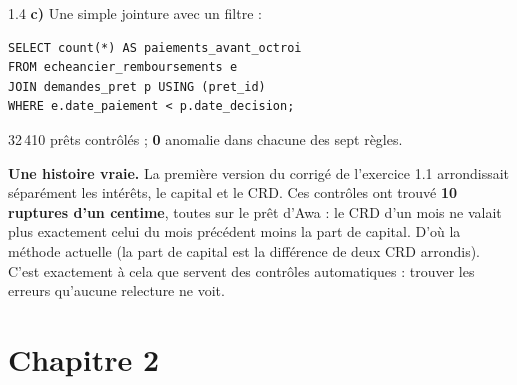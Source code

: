 \begin{correction}{1.4}
\textbf{c)} Une simple jointure avec un filtre :
\begin{lstlisting}[style=long]
SELECT count(*) AS paiements_avant_octroi
FROM echeancier_remboursements e
JOIN demandes_pret p USING (pret_id)
WHERE e.date_paiement < p.date_decision;
\end{lstlisting}

\begin{resultat}
32\,410 prêts contrôlés ; \textbf{0} anomalie dans chacune des sept règles.
\end{resultat}

\textbf{Une histoire vraie.} La première version du corrigé de l'exercice 1.1 arrondissait séparément
les intérêts, le capital et le CRD. Ces contrôles ont trouvé \textbf{10 ruptures d'un centime}, toutes
sur le prêt d'Awa : le CRD d'un mois ne valait plus exactement celui du mois précédent moins la part de
capital. D'où la méthode actuelle (la part de capital est la différence de deux CRD arrondis). C'est
exactement à cela que servent des contrôles automatiques : trouver les erreurs qu'aucune relecture ne
voit.
\end{correction}

\section*{Chapitre 2}

